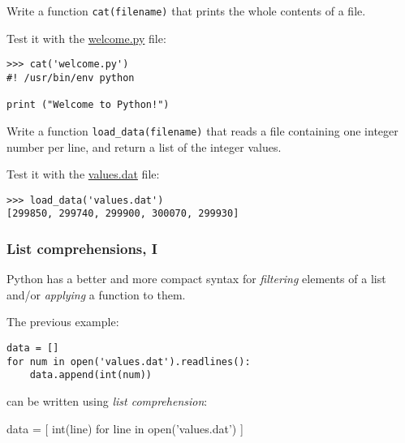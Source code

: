 \documentclass[english,serif,mathserif,xcolor=pdftex,dvipsnames,table]{beamer}
\begin{document}
\begin{frame}[fragile]
  \begin{exercise}
    Write a function \lstinline|cat(filename)| that prints the whole contents of a file.

    \+
    Test it with the
    \href{https://raw.github.com/gc3-uzh-ch/python-course/master/welcome.py}{welcome.py}
    file:
\begin{lstlisting}
>>> cat('welcome.py')
#! /usr/bin/env python

print ("Welcome to Python!")
\end{lstlisting}
  \end{exercise}

  \+
  \begin{exercise}
    Write a function \lstinline|load_data(filename)| that reads a file
    containing one integer number per line, and return a list of the
    integer values.

    \+
    Test it with the
    \href{https://raw.github.com/gc3-uzh-ch/python-course/master/values.dat}{values.dat}
    file:
\begin{lstlisting}
>>> load_data('values.dat')
[299850, 299740, 299900, 300070, 299930]
\end{lstlisting}
  \end{exercise}
\end{frame}

\begin{frame}[fragile]
  \frametitle{List comprehensions, I}
  Python has a better and more compact syntax for \emph{filtering} elements
  of a list and/or \emph{applying} a function to them.

  \+
  The previous example:
  \begin{lstlisting}
data = []
for num in open('values.dat').readlines():
    data.append(int(num))
  \end{lstlisting}
  \+
  can be written using \textit{list comprehension}:
  \begin{python}
data = [ int(line) for line in open('values.dat') ]
  \end{python}

\end{frame}
\end{document}
